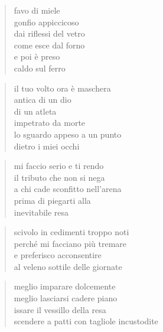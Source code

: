 \clearpage


\vspace*{2cm}

	\begin{verse}
		favo di miele\\
		gonfio appiccicoso\\
		dai riflessi del vetro\\
		come esce dal forno\\
		e poi è preso\\
		caldo sul ferro
	\end{verse}

	\begin{verse}
		il tuo volto ora è maschera\\
		antica di un dio\\
		di un atleta\\
		impetrato da morte\\
		lo sguardo appeso a un punto\\
		dietro i miei occhi
	\end{verse}

	\begin{verse}
		mi faccio serio e ti rendo\\
		il tributo che non si nega\\
		a chi cade sconfitto nell'arena\\
		prima di piegarti alla\\
		inevitabile resa
	\end{verse}

\clearpage


\vspace*{2cm}

	\begin{verse}
		scivolo in cedimenti troppo noti\\
		perché mi facciano più tremare\\
		e preferisco acconsentire\\
		al veleno sottile delle giornate
	\end{verse}

	\begin{verse}
		meglio imparare dolcemente\\
		meglio lasciarsi cadere piano\\
		issare il vessillo della resa\\
		scendere a patti con tagliole incustodite
	\end{verse}

